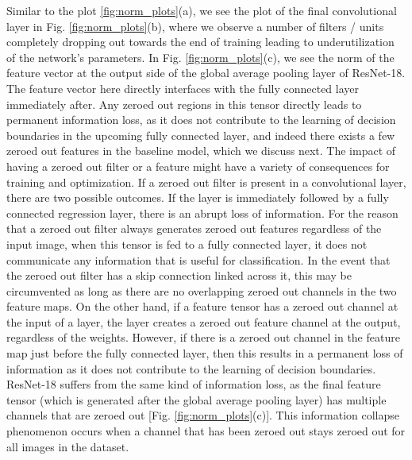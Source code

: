 \documentclass[times,sort&compress]{elsarticle}
\begin{document}
Similar to the plot \ref{fig:norm_plots}(a), we see the plot of the final convolutional
layer in Fig. \ref{fig:norm_plots}(b), where we observe a number of filters / units
completely dropping out towards the end of training leading to underutilization of the
network's parameters. In Fig. \ref{fig:norm_plots}(c), we see the norm of the feature
vector at the output side of the global average pooling layer of ResNet-18. The feature
vector here directly interfaces with the fully connected layer immediately after. Any
zeroed out regions in this tensor directly leads to permanent information loss, as it
does not contribute to the learning of decision boundaries in the upcoming fully
connected layer, and indeed there exists a few zeroed out features in the baseline
model, which we discuss next. The impact of having a zeroed out filter or a feature
might have a variety of consequences for training and optimization. If a zeroed out
filter is present in a convolutional layer, there are two possible outcomes. If the
layer is immediately followed by a fully connected regression layer, there is an abrupt
loss of information. For the reason that a zeroed out filter always generates zeroed out
features regardless of the input image, when this tensor is fed to a fully connected
layer, it does not communicate any information that is useful for classification. In the
event that the zeroed out filter has a skip connection linked across it, this may be
circumvented as long as there are no overlapping zeroed out channels in the two feature
maps. On the other hand, if a feature tensor has a zeroed out channel at the input of a
layer, the layer creates a zeroed out feature channel at the output, regardless of the
weights. However, if there is a zeroed out channel in the feature map just before the
fully connected layer, then this results in a permanent loss of information as it does
not contribute to the learning of decision boundaries. ResNet-18 suffers from the same
kind of information loss, as the final feature tensor (which is generated after the
global average pooling layer) has multiple channels that are zeroed out [Fig.
\ref{fig:norm_plots}(c)]. This information collapse phenomenon occurs when a channel
that has been zeroed out stays zeroed out for all images in the dataset.
\end{document}
